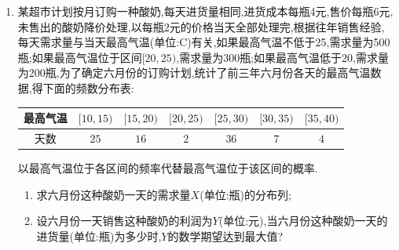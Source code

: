 \begin{enumerate}
\begin{jieda}
    \begin{enumerate}
        \item 因为甲同学上学期间的三天中到校情况相互独立,
且每天 7:30 之前到校的概率均为 $\dfrac{2}{3}$ ,故 $X \sim  B(3$ ,
$\left. \dfrac{2}{3}\right)$ ,从而 $P\left( {X = k}\right)  = {{C}}_{3}^{k} \times  {\left( \dfrac{2}{3}\right) }^{k} \times  {\left( \dfrac{1}{3}\right) }^{3 - k},k = 0$ ,
1,2,3. 所以随机变量 $X$ 的分布列为
$\begin{pmatrix}
     0& 1& 2& 3\\
    \dfrac{1}{27} & \dfrac{2}{9} & \dfrac{4}{9}& \dfrac{8}{27}
\end{pmatrix}$

故随机变量 $X$ 的数学期望 ${EX} = 3 \times  \dfrac{2}{3} = 2$ .
    \item 设乙同学上学期间的三天中 7:30 之前到校的天数
为 $Y$ ,则 $Y \sim  B\left( {3,\dfrac{2}{3}}\right)$ ,且 $M = \{ X = 3,Y = 1\}  \cup$
$\{ X = 2,Y = 0\}$ . 由题意知事件 $\{ X = 3,Y = 1\}$ 与事件
$\{ X = 2,Y = 0\}$ 互斥,且事件 $\{ X = 3\}$ 与事件 $\{ Y = 1\}$ ,事
件 $\{ X = 2\}$ 与事件 $\{ Y = 0\}$ 均相互独立,从而由 (1) 知
$P\left( M\right)  = P\left( {\{ X = 3,Y = 1\} \bigcup \{ X = 2,Y = 0\} }\right)  = P(X =$
$3,Y = 1) + P\left( {X = 2,Y = 0}\right)  = P\left( {X = 3}\right) P\left( {Y = 1}\right)  +$
$P\left( {X = 2}\right) P\left( {Y = 0}\right)  = \dfrac{8}{27} \times  \dfrac{2}{9} + \dfrac{4}{9} \times  \dfrac{1}{27} = \dfrac{20}{243}.$
    \end{enumerate}
\end{jieda}

\item 某超市计划按月订购一种酸奶,每天进货量相同,进货成本每瓶4元,售价每瓶6元,未售出的酸奶降价处理,以每瓶2元的价格当天全部处理完,根据往年销售经验,每天需求量与当天最高气温(单位:C)有关,如果最高气温不低于25,需求量为500瓶;如果最高气温位于区间$[20,25)$,需求量为300瓶;如果最高气温低于20,需求量为200瓶,为了确定六月份的订购计划,统计了前三年六月份各天的最高气温数据,得下面的频数分布表:
\begin{center}
\begin{tabular}{|c|c|c|c|c|c|c|}
\hline
最高气温 & $[10, 15)$ & $[15, 20)$ & $[20, 25)$ & $[25, 30)$ & $[30, 35)$ & $[35, 40)$ \\
\hline
天数 & $25$ & $16$ & $2$ & $36$ & $7$ & $4$ \\
\hline
\end{tabular}
\end{center}
以最高气温位于各区间的频率代替最高气温位于该区间的概率.
\begin{enumerate}
\item 求六月份这种酸奶一天的需求量$X$(单位:瓶)的分布列;
\item 设六月份一天销售这种酸奶的利润为$Y$(单位:元),当六月份这种酸奶一天的进货量(单位:瓶)为多少时,$Y$的数学期望达到最大值?
\end{enumerate}


\end{enumerate}
